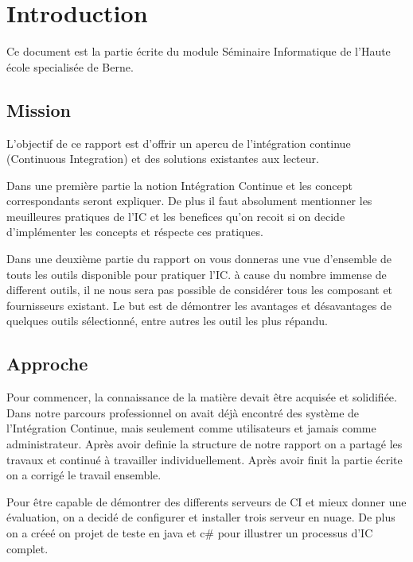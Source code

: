 \chapter{Introduction}
\label{chap:introduction}
Ce document est la partie écrite du module Séminaire Informatique de l'Haute école specialisée de Berne.

\section{Mission}
\label{sec:intro_mission}
L'objectif de ce rapport est d'offrir un apercu de l'intégration continue (Continuous Integration) et des solutions existantes aux lecteur.

Dans une première partie la notion Intégration Continue et les concept correspondants seront expliquer. De plus il faut absolument mentionner les meuilleures pratiques de l'IC et les benefices qu'on recoit si on decide d'implémenter les concepts et réspecte ces pratiques.

Dans une deuxième partie du rapport on vous donneras une vue d'ensemble de touts les outils disponible pour pratiquer l'IC. à cause du nombre immense de different outils, il ne nous sera pas possible de considérer tous les composant et fournisseurs existant. Le but est de démontrer les avantages et désavantages de quelques outils sélectionné, entre autres les outil les plus répandu.

\section{Approche}
\label{sec:intro_approche}

Pour commencer, la connaissance de la matière devait être acquisée et solidifiée. Dans notre parcours professionnel on avait déjà encontré des système de l'Intégration Continue, mais seulement comme utilisateurs et jamais comme administrateur. Après avoir definie la structure de notre rapport on a partagé les travaux et continué à travailler individuellement. Après avoir finit la partie écrite on a corrigé le travail ensemble.

Pour être capable de démontrer des differents serveurs de CI et mieux donner une évaluation, on a decidé de configurer et installer trois serveur en nuage. De plus on a créeé on projet de teste en java et c\# pour illustrer un processus d'IC complet.

